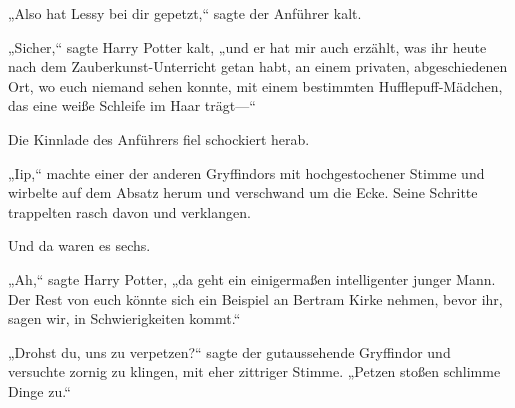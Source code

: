 „Also hat Lessy bei dir gepetzt,“ sagte der Anführer kalt.

„Sicher,“ sagte Harry Potter kalt, „und er hat mir auch erzählt, was ihr heute nach dem Zauberkunst-Unterricht getan habt, an einem privaten, abgeschiedenen Ort, wo euch niemand sehen konnte, mit einem bestimmten Hufflepuff-Mädchen, das eine weiße Schleife im Haar trägt—“

Die Kinnlade des Anführers fiel schockiert herab.

„Iip,“ machte einer der anderen Gryffindors mit hochgestochener Stimme und wirbelte auf dem Absatz herum und verschwand um die Ecke. Seine Schritte trappelten rasch davon und verklangen.

Und da waren es sechs.

„Ah,“ sagte Harry Potter, „da geht ein einigermaßen intelligenter junger Mann. Der Rest von euch könnte sich ein Beispiel an Bertram Kirke nehmen, bevor ihr, sagen wir, in Schwierigkeiten kommt.“%

„Drohst du, uns zu verpetzen?“ sagte der gutaussehende Gryffindor und versuchte zornig zu klingen, mit eher zittriger Stimme. „Petzen stoßen schlimme Dinge zu.“

